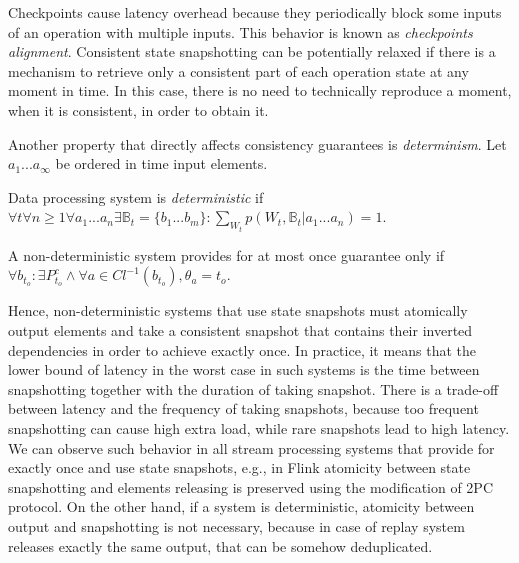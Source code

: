 Checkpoints cause latency overhead because they periodically block some inputs of an operation with multiple inputs. This behavior is known as {\em checkpoints alignment}. Consistent state snapshotting can be potentially relaxed if there is a mechanism to retrieve only a consistent part of each operation state at any moment in time. In this case, there is no need to technically reproduce a moment, when it is consistent, in order to obtain it.

Another property that directly affects consistency guarantees is {\em determinism}. Let $a_1...a_\infty$ be ordered in time input elements.

\begin{definition}{Data processing system is {\em deterministic}}
if \\
$\forall{t} \forall{n\geq1} \forall{a_1...a_n}\exists{\mathbb{B}_t={\{b_1...b_m\}}}:\sum\limits_{W_t} p(W_t,\mathbb{B}_t|a_1...a_n)=1$.
\end{definition}

\begin{theorem}
A non-deterministic system provides for at most once guarantee only if $\forall{b_{t_o}}:\exists{P^{c}_{t_o}} \wedge \forall{a\in{Cl^{-1}(b_{t_o})}},\theta_a=t_o$.  
\end{theorem}

Hence, non-deterministic systems that use state snapshots must atomically output elements and take a consistent snapshot that contains their inverted dependencies in order to achieve exactly once. In practice, it means that the lower bound of latency in the worst case in such systems is the time between snapshotting together with the duration of taking snapshot. There is a trade-off between latency and the frequency of taking snapshots, because too frequent snapshotting can cause high extra load, while rare snapshots lead to high latency. We can observe such behavior in all stream processing systems that provide for exactly once and use state snapshots, e.g., in Flink atomicity between state snapshotting and elements releasing is preserved using the modification of 2PC protocol. On the other hand, if a system is deterministic, atomicity between output and snapshotting is not necessary, because in case of replay system releases exactly the same output, that can be somehow deduplicated.